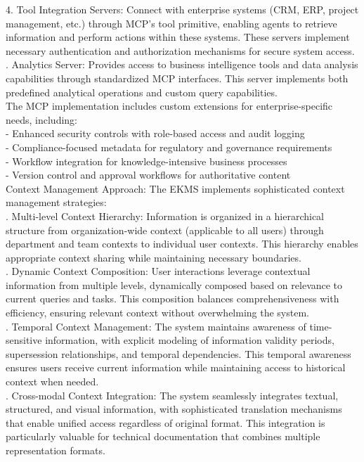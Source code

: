 4. Tool Integration Servers: Connect with enterprise systems (CRM, ERP, project management, etc.) through MCP's tool primitive, enabling agents to retrieve information and perform actions within these systems. These servers implement necessary authentication and authorization mechanisms for secure system access.\\ . Analytics Server: Provides access to business intelligence tools and data analysis capabilities through standardized MCP interfaces. This server implements both predefined analytical operations and custom query capabilities.\\ \newline
The MCP implementation includes custom extensions for enterprise-specific needs, including:\\ \newline
- Enhanced security controls with role-based access and audit logging\\ \newline
- Compliance-focused metadata for regulatory and governance requirements\\ \newline
- Workflow integration for knowledge-intensive business processes\\ \newline
- Version control and approval workflows for authoritative content\\ \newline
Context Management Approach: The EKMS implements sophisticated context management strategies:\\ . Multi-level Context Hierarchy: Information is organized in a hierarchical structure from organization-wide context (applicable to all users) through department and team contexts to individual user contexts. This hierarchy enables appropriate context sharing while maintaining necessary boundaries.\\ . Dynamic Context Composition: User interactions leverage contextual information from multiple levels, dynamically composed based on relevance to current queries and tasks. This composition balances comprehensiveness with efficiency, ensuring relevant context without overwhelming the system.\\ . Temporal Context Management: The system maintains awareness of time-sensitive information, with explicit modeling of information validity periods, supersession relationships, and temporal dependencies. This temporal awareness ensures users receive current information while maintaining access to historical context when needed.\\ . Cross-modal Context Integration: The system seamlessly integrates textual, structured, and visual information, with sophisticated translation mechanisms that enable unified access regardless of original format. This integration is particularly valuable for technical documentation that combines multiple representation formats.\\
